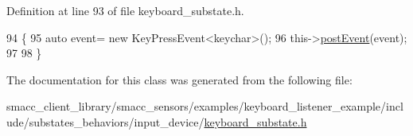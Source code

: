 Definition at line 93 of file keyboard\+\_\+substate.\+h.


\begin{DoxyCode}
94   \{
95     \textcolor{keyword}{auto} \textcolor{keyword}{event}= \textcolor{keyword}{new} KeyPressEvent<keychar>();
96     this->\hyperlink{classsmacc_1_1SmaccSubStateBehavior_a8538664f9828247727a27446112788a2}{postEvent}(event);
97 
98   \}      
\end{DoxyCode}


The documentation for this class was generated from the following file\+:\begin{DoxyCompactItemize}
\item 
smacc\+\_\+client\+\_\+library/smacc\+\_\+sensors/examples/keyboard\+\_\+listener\+\_\+example/include/substates\+\_\+behaviors/input\+\_\+device/\hyperlink{keyboard__substate_8h}{keyboard\+\_\+substate.\+h}\end{DoxyCompactItemize}

